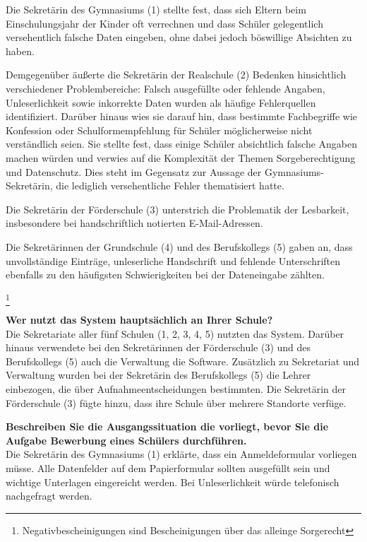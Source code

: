 Die Sekretärin des Gymnasiums (1) stellte fest, dass sich Eltern beim Einschulungsjahr der Kinder oft verrechnen und dass Schüler gelegentlich versehentlich falsche Daten eingeben, ohne dabei jedoch böswillige Absichten zu haben.

Demgegenüber äußerte die Sekretärin der Realschule (2) Bedenken hinsichtlich verschiedener Problembereiche: Falsch ausgefüllte oder fehlende Angaben, Unleserlichkeit sowie inkorrekte Daten wurden als häufige Fehlerquellen identifiziert. Darüber hinaus wies sie darauf hin, dass bestimmte Fachbegriffe wie \glqq Konfession\grqq{} oder \glqq Schulformempfehlung\grqq{} für Schüler möglicherweise nicht verständlich seien. Sie stellte fest, dass einige Schüler absichtlich falsche Angaben machen würden und verwies auf die Komplexität der Themen Sorgeberechtigung und Datenschutz. Dies steht im Gegensatz zur Aussage der Gymnasiums-Sekretärin, die lediglich versehentliche Fehler thematisiert hatte.

Die Sekretärin der Förderschule (3) unterstrich die Problematik der Lesbarkeit, insbesondere bei handschriftlich notierten E-Mail-Adressen.

Die Sekretärinnen der Grundschule (4) und des Berufskollegs (5) gaben an, dass unvollständige Einträge, unleserliche Handschrift und fehlende Unterschriften ebenfalls zu den häufigsten Schwierigkeiten bei der Dateneingabe zählten.

\footnote{Negativbescheinigungen sind Bescheinigungen über das alleinge Sorgerecht}


\textbf{Wer nutzt das System hauptsächlich an Ihrer Schule?}\\
Die Sekretariate aller fünf Schulen (1, 2, 3, 4, 5) nutzten das System. Darüber hinaus verwendete bei den Sekretärinnen der Förderschule (3) und des Berufskollegs (5) auch die Verwaltung die Software. Zusätzlich zu Sekretariat und Verwaltung wurden bei der Sekretärin des Berufskollegs (5) die Lehrer einbezogen, die über Aufnahmeentscheidungen bestimmten. Die Sekretärin der Förderschule (3) fügte hinzu, dass ihre Schule über mehrere Standorte verfüge.


\textbf{Beschreiben Sie die Ausgangssituation die vorliegt, bevor Sie die Aufgabe \glqq Bewerbung eines Schülers\grqq{} durchführen.}\\
Die Sekretärin des Gymnasiums (1) erklärte, dass ein Anmeldeformular vorliegen müsse. Alle Datenfelder auf dem Papierformular sollten ausgefüllt sein und wichtige Unterlagen eingereicht werden. Bei Unleserlichkeit würde telefonisch nachgefragt werden.

